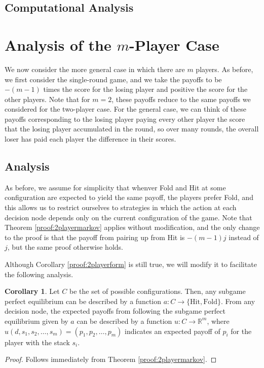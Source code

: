 \documentclass{article}
\theoremstyle{definition}
\newcounter{a}
\newtheorem{corollary}[a]{Corollary}
\begin{document}
\subsection{Computational Analysis}

\section{Analysis of the $m$-Player Case}

We now consider the more general case in which there are $m$ players. As before, we first consider the single-round game, and we take the payoffs to be $-(m-1)$ times the score for the losing player and positive the score for the other players. Note that for $m=2$, these payoffs reduce to the same payoffs we considered for the two-player case. For the general case, we can think of these payoffs corresponding to the losing player paying every other player the score that the losing player accumulated in the round, so over many rounds, the overall loser has paid each player the difference in their scores.

\subsection{Analysis}

As before, we assume for simplicity that whenver Fold and Hit at some configuration are expected to yield the same payoff, the players prefer Fold, and this allows us to restrict ourselves to strategies in which the action at each decision node depends only on the current configuration of the game. Note that Theorem \ref{proof:2playermarkov} applies without modification, and the only change to the proof is that the payoff from pairing up from Hit is $-(m-1)j$ instead of $j$, but the same proof otherwise holds.

Although Corollary \ref{proof:2playerform} is still true, we will modify it to facilitate the following analysis.

\begin{corollary}
Let $C$ be the set of possible configurations. Then, any subgame perfect equilibrium can be described by a function $a:C \to \{\text{Hit},\text{Fold}\}$. From any decision node, the expected payoffs from following the subgame perfect equilibrium given by $a$ can be described by a function $u:C \to \mathbb{R}^m$, where $u(d,s_1,s_2,\dots,s_m)=(p_1,p_2,\dots,p_m)$ indicates an expected payoff of $p_i$ for the player with the stack $s_i$.
\begin{proof}
Follows immediately from Theorem \ref{proof:2playermarkov}.
\end{proof}
\label{proof:mplayerform}
\end{corollary}
\end{document}
